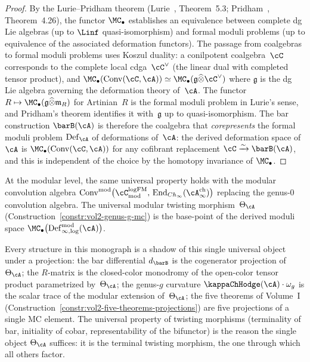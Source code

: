 \begin{proof}
By the Lurie--Pridham theorem
(Lurie~\cite{Lur11}, Theorem~5.3;
Pridham~\cite{Pri10}, Theorem~4.26),
the functor $\MC_\bullet$ establishes an equivalence between
complete dg Lie algebras (up to $\Linf$ quasi-isomorphism) and
formal moduli problems (up to equivalence of the associated
deformation functors). The passage from coalgebras to formal moduli
problems uses Koszul duality: a conilpotent coalgebra~$\cC$
corresponds to the complete local cdga~$\cC^\vee$ (the linear dual
with completed tensor product), and
$\MC_\bullet(\mathrm{Conv}(\cC, \cA)) \simeq
\MC_\bullet(\mathfrak{g} \widehat{\otimes} \cC^\vee)$
where $\mathfrak{g}$ is the dg Lie algebra governing the
deformation theory of~$\cA$. The functor
$R \mapsto \MC_\bullet(\mathfrak{g} \widehat{\otimes} \mathfrak{m}_R)$
for Artinian~$R$ is the formal moduli problem in Lurie's sense,
and Pridham's theorem \cite[Theorem~4.26]{Pri10} identifies it
with~$\mathfrak{g}$ up to quasi-isomorphism.
The bar construction $\barB(\cA)$ is
therefore the coalgebra that \emph{corepresents} the formal moduli
problem $\mathrm{Def}_\cA$ of deformations of~$\cA$: the derived
deformation space of~$\cA$ is
$\MC_\bullet(\mathrm{Conv}(\cC, \cA))$ for any cofibrant
replacement $\cC \xrightarrow{\sim} \barB(\cA)$, and this is
independent of the choice by the homotopy invariance of
$\MC_\bullet$.
\end{proof}

\begin{remark}
\label{rem:modular-upgrade-universal}
At the modular level, the same universal property holds with the
modular convolution algebra
$\mathrm{Conv}^{\mathrm{mod}}\bigl(
 \cC^{\mathrm{logFM}}_{\mathrm{mod}},\,
 \mathrm{End}_{Ch_\infty}(\cA^{\mathrm{ch}}_\infty)
\bigr)$
replacing the genus-$0$ convolution algebra. The universal modular
twisting morphism~$\Theta_\cA$
(Construction~\ref{constr:vol2-genus-g-mc})
is the base-point of the derived moduli space
$\MC_\bullet\bigl(\mathrm{Def}^{\mathrm{mod}}_{\infty,\log}(\cA)
\bigr)$.

Every structure in this monograph is a shadow of this single
universal object under a projection: the bar differential $d_{\barB}$
is the cogenerator projection of~$\Theta_\cA$; the
$R$-matrix is the closed-color monodromy of the open-color tensor
product parametrized by~$\Theta_\cA$; the genus-$g$ curvature
$\kappaChHodge(\cA) \cdot \omega_g$ is the scalar trace of the modular
extension of~$\Theta_\cA$; the five theorems of Volume~I
(Construction~\ref{constr:vol2-five-theorems-projections}) are five
projections of a single MC element. The universal property of
twisting morphisms (terminality of bar, initiality of cobar,
representability of the bifunctor) is the reason the single
object $\Theta_\cA$ suffices: it is the terminal twisting morphism,
the one through which all others factor.
\end{remark}

